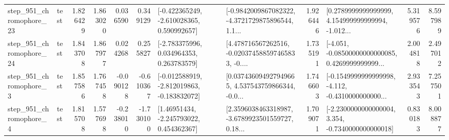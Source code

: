\begin{tabular}{llrrrrllrlrr}
  step\_951\_chromophore\_23 &      test &      1.826429 &    1.863020 &      0.036590 &  0.349129 &   [-0.422365249, -2.610028365, 0.590992657] &  [-0.9842009867082322, -4.3721729875896544, 1.1... &       1.926446 &  [0.2789999999999999, 4.154999999999994, -1.012... &            5.319576 &          8.597989 \\
  step\_951\_chromophore\_24 &      test &      1.843708 &    1.867977 &      0.024268 &  0.255827 &    [-2.783375996, 0.034964353, 0.263783579] &  [4.478716567262516, -0.020374588597465833, -0.... &       1.735191 &  [-4.051, -0.08500000000000085, 0.4269999999999... &            2.004818 &          2.497012 \\
   step\_951\_chromophore\_3 &      test &      1.857586 &    1.767458 &     -0.090128 & -0.610367 &  [-0.012588919, -2.812019863, -0.183832072] &  [0.037436094927949665, 4.537543759866344, -0.0... &       1.746603 &  [-0.1549999999999998, -4.112, -0.4310000000000... &            2.933543 &          7.257501 \\
   step\_951\_chromophore\_4 &      test &      1.815708 &    1.577698 &     -0.238010 & -1.730100 &     [1.46951434, -2.245793022, 0.454362367] &  [2.3596038463318987, -3.6789923501559727, 0.18... &       1.709071 &  [-2.2300000000000004, 3.354, -0.7340000000000018] &            0.830183 &          8.008877 \\
\bottomrule
\end{tabular}

